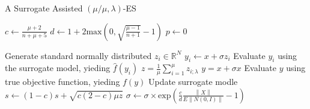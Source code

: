 

\begin{algorithm}
\caption{A Surrogate Assisted $(\mu/\mu,\lambda)$-ES}
\label{alg}
\begin{algorithmic}[1]
\STATE $c \leftarrow  \frac{\mu +2}{n+\mu+5}$ 
\STATE $d \leftarrow 1 + 2 \text{max}(0, \sqrt{\frac{\mu - 1}{n+1} } - 1 ) $
\STATE $p \leftarrow 0$

		\STATE Generate standard normally distributed $z_i \in \mathbb{R}^N $
		\STATE $y_i \leftarrow x + \sigma z_i$
		\STATE Evaluate $y_i$ using the surrogate model, yieding $\hat{f}(y_i)$
	\ENDFOR
	\STATE $z = \frac{1}{\mu} \sum_{i=1}^{\mu} z_{i;\lambda}$
	\STATE $y = x + \sigma x$
	\STATE Evaluate $y$ using true objective function, yieding $f(y)$
	\STATE Update surrogate modle 
	\STATE $s \leftarrow (1-c)s + \sqrt{ c(2-c) \mu z}$
	\STATE $\sigma \leftarrow \sigma \times \text{exp} \left(\frac{c}{d} \frac{\left\lVert X \right\rVert} { E \left\lVert N(0,I) \right\rVert} -1 \right )$
		

\ENDWHILE

\end{algorithmic}
\end{algorithm}



		
